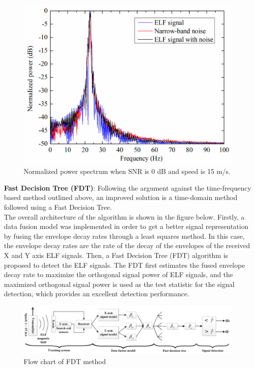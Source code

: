 \documentclass[11pt]{article}		%
\newlength{\imageheight}	 %
\begin{document}
         \begin{figure}[h]
			\centering
			\includegraphics[height=\imageheight]{SNRPower.png}
			\caption{Normalized power spectrum when SNR is 0 dB and speed is 15 m/s.}
			\label{comparisonComms}
		\end{figure}
	    
	    \textbf{Fast Decision Tree (FDT)}:
		Following the argument against the time-frequency based method outlined above, an improved solution is a time-domain method followed using a Fast Decision Tree. \\
    	\hspace*{3ex}The overall architecture of the algorithm is shown in the figure below. Firstly, a data fusion model was implemented in order to get a better signal representation by fusing the envelope decay rates through a least squares method. In this case, the envelope decay rates are the rate of the decay of the envelopes of the received X and Y axis ELF signals. Then, a Fast Decision Tree (FDT) algorithm is proposed to detect the ELF signals. The FDT first estimates the fused envelope decay rate to maximize the orthogonal signal power of ELF signals, and the maximized orthogonal signal power is used as the test statistic for the signal detection, which provides an excellent detection performance.
        
         \begin{figure}[h]
			\centering
			\includegraphics[scale=0.12]{FDT.png}
			\caption{Flow chart of FDT method }
			\label{comparisonComms}
		\end{figure}
		
\end{document}
